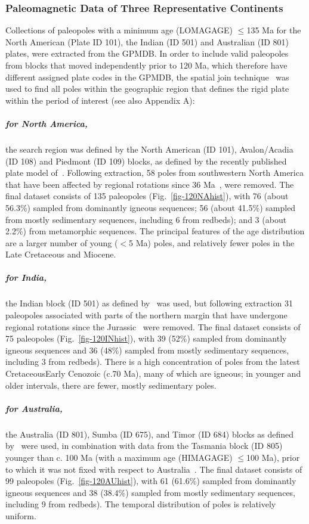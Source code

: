 \subsubsection{Paleomagnetic Data of Three Representative Continents}

Collections of paleopoles with a minimum age (LOMAGAGE) $\leq$135 Ma for the
North American (Plate ID 101), the Indian (ID 501) and Australian (ID 801)
plates, were extracted from the GPMDB\@. In order to include valid paleopoles
from blocks that moved independently prior to 120 Ma, which therefore have
different assigned plate codes in the GPMDB, the spatial join
technique~\cite{J07} was used to find all poles within the geographic region
that defines the rigid plate within the period of interest (see also Appendix
A):

\subparagraph{for North America,}
the search region was defined by the North American (ID 101), Avalon/Acadia (ID
108) and Piedmont (ID 109) blocks, as defined by the recently published plate
model of~\cite{Y18}. Following extraction, 58 poles from southwestern North
America that have been affected by regional rotations since 36 Ma~\cite{Mc06},
were removed. The final dataset consists of 135 paleopoles
(Fig.~\ref{fig-120NAhist}), with 76 (about 56.3\%) sampled from dominantly
igneous sequences; 56 (about 41.5\%) sampled from mostly sedimentary sequences,
including 6 from redbeds); and 3 (about 2.2\%) from metamorphic sequences. The
principal features of the age distribution are a larger number of young ($<$5
Ma) poles, and relatively fewer poles in the Late Cretaceous and Miocene.

\subparagraph{for India,}
the Indian block (ID 501) as defined by~\cite{Y18} was used, but following
extraction 31 paleopoles associated with parts of the northern margin that
have undergone regional rotations since the Jurassic~\cite{G15} were removed.
The final dataset consists of 75 paleopoles (Fig.~\ref{fig-120INhist}), with
39 (52\%) sampled from dominantly igneous sequences and 36 (48\%) sampled from
mostly sedimentary sequences, including 3 from redbeds). There is a high
concentration of poles from the latest Cretaceous\textendash{}Early Cenozoic
(c.70 Ma), many of which are igneous; in younger and older
intervals, there are fewer, mostly sedimentary poles.

\subparagraph{for Australia,}
the Australia (ID 801), Sumba (ID 675), and Timor (ID 684) blocks as defined
by~\cite{Y18} were used, in combination with data from the Tasmania block (ID
805) younger than c. 100 Ma (with a maximum age (HIMAGAGE) $\leq$100 Ma), prior
to which it was not fixed with respect to Australia~\cite{Y18}. The final
dataset consists of 99 paleopoles (Fig.~\ref{fig-120AUhist}), with 61 (61.6\%)
sampled from dominantly igneous sequences and 38 (38.4\%) sampled from mostly
sedimentary sequences, including 9 from redbeds). The temporal distribution of
poles is relatively uniform.

